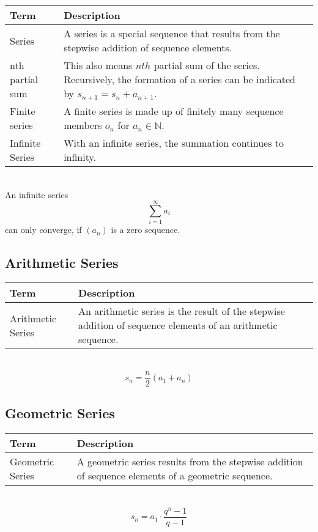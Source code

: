 \documentclass{book}
\begin{document}
\begin{tabular}{p{3cm}p{10.5cm}}
  \toprule
  \textbf{Term} & \textbf{Description} \\
  \midrule
  Series    & A series is a special sequence that results from the stepwise addition of sequence elements.\\
  \midrule
  nth partial sum & This also means $nth$ partial sum of the series. Recursively, the formation of a series can be indicated by $s_{n+1} = s_{n} + a_{n+1}$.\\
  \midrule
  Finite series & A finite series is made up of finitely many sequence members $o_{n}$ for $a_{n}\in\mathbb{N}$.\\
  \midrule
  Infinite Series & With an infinite series, the summation continues to infinity.\\
  \bottomrule
\end{tabular}\\

An infinite series
\[
  \sum_{i=1}^{\infty} a_{i}
\]
can only converge, if $(a_{n})$ is a zero sequence.

\subsection{Arithmetic Series}
\begin{tabular}{p{3cm}p{10.5cm}}
  \toprule
  \textbf{Term} & \textbf{Description} \\
  \midrule
  Arithmetic Series & An arithmetic series is the result of the stepwise addition of sequence elements of an arithmetic sequence.\\
  \bottomrule
\end{tabular}\\

\[
  s_{n} = \frac{n}{2}\left(a_{1}+a_{n}\right)
\]

\subsection{Geometric Series}
\begin{tabular}{p{3cm}p{10.5cm}}
  \toprule
  \textbf{Term} & \textbf{Description} \\
  \midrule
  Geometric Series & A geometric series results from the stepwise addition of sequence elements of a geometric sequence.\\
  \bottomrule
\end{tabular}\\

\[
  s_{n} = a_{1}\cdot\frac{q^{n}-1}{q-1}
\]
\end{document}
